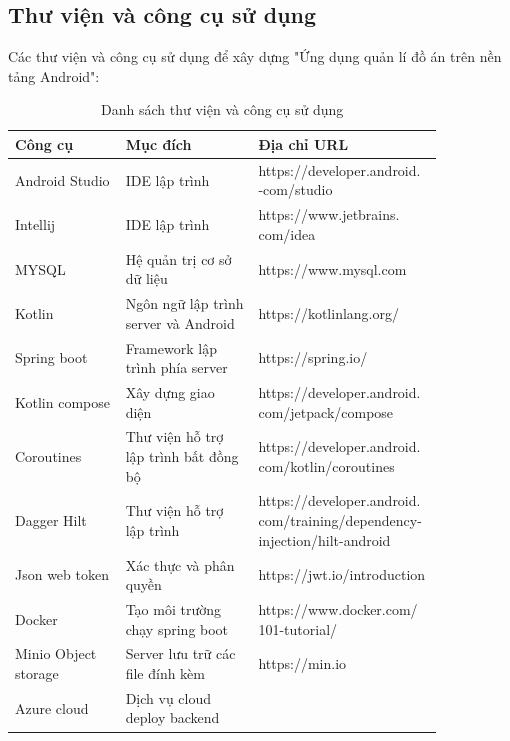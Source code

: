 \documentclass[../Main.tex]{subfiles}
\begin{document}
\subsection{Thư viện và công cụ sử dụng}
Các thư viện và công cụ sử dụng để xây dựng "Ứng dụng quản lí đồ án trên nền tảng Android": \newpage
\begin{table}[H]
\centering
\bgroup
\renewcommand{\arraystretch}{1.6}%

\begin{tabular}{|L{0.25\linewidth}|L{0.3\linewidth}|L{0.3\linewidth}|}
\hline
\textbf{Công cụ} & \textbf{Mục đích} & \textbf{Địa chỉ URL} \\ \hline
Android Studio & IDE lập trình & https://developer.android. -com/studio \\ \hline
Intellij & IDE lập trình & https://www.jetbrains. com/idea \\ \hline
MYSQL & Hệ quản trị cơ sở dữ liệu & https://www.mysql.com \\ \hline
Kotlin & Ngôn ngữ lập trình server và Android& https://kotlinlang.org/ \\ \hline
Spring boot & Framework lập trình phía server & https://spring.io/ \\ \hline
Kotlin compose & Xây dựng giao diện & https://developer.android. com/jetpack/compose \\ \hline
Coroutines & Thư viện hỗ trợ lập trình bất đồng bộ & https://developer.android. com/kotlin/coroutines \\ \hline
Dagger Hilt & Thư viện hỗ trợ lập trình & https://developer.android. com/training/dependency-injection/hilt-android \\ \hline
Json web token & Xác thực và phân quyền & https://jwt.io/introduction \\ \hline
Docker & Tạo môi trường chạy spring boot & https://www.docker.com/ 101-tutorial/ \\ \hline
Minio Object storage & Server lưu trữ các file đính kèm & https://min.io  \\ \hline
Azure cloud & Dịch vụ cloud deploy backend &  \\ \hline
\end{tabular}

\egroup
\caption{Danh sách thư viện và công cụ sử dụng}
\end{table}

\newpage
\end{document}
